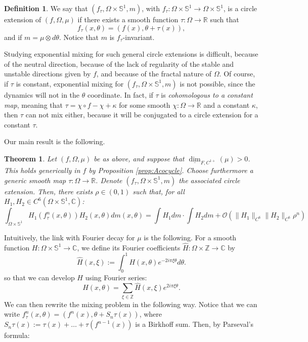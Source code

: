 \documentclass[a4paper]{article}
\newtheorem{theorem}{Theorem}[section]
\theoremstyle{definition}
\newtheorem{definition}{Definition}[section]
\begin{document}
\begin{definition}
We say that $(f_\tau,\Omega \times \mathbb{S}^1,m)$, with $f_\tau:\Omega \times \mathbb{S}^1 \rightarrow \Omega \times \mathbb{S}^1$, is a circle extension of $(f,\Omega,\mu)$ if there exists a smooth function $\tau:\Omega \rightarrow \mathbb{R}$ such that $$ f_\tau(x,\theta) = (f(x),\theta+\tau(x)) ,$$
and if $m = \mu \otimes d\theta$.  Notice that $m$ is $f_\tau$-invariant.
\end{definition}

Studying exponential mixing for such general circle extensions is difficult, because of the neutral direction, because of the lack of regularity of the stable and unstable directions given by $f$, and because of the fractal nature of $\Omega$. Of course, if $\tau$ is constant, exponential mixing for $(f_\tau,\Omega\times \mathbb{S}^1,m)$ is not possible, since the dynamics will not  in the $\theta$ coordinate. In fact, if $\tau$ is \emph{cohomologous to a constant map}, meaning that $\tau= \chi \circ f - \chi + \kappa $ for some smooth $\chi:\Omega\rightarrow \mathbb{R}$ and a constant $\kappa$, then $\tau$ can not mix either, because it will be conjugated to a circle extension for a constant $\tau$.

Our main result is the following.  

\begin{theorem}\label{th:extension}
Let $(f,\Omega,\mu)$ be as above, and suppose that $\underline{\dim}_{F,C^{1+}}(\mu)>0$. This holds generically in $f$ by Proposition \ref{prop:Acocycle}. Choose furthermore a generic smooth map $\tau:\Omega \rightarrow \mathbb{R}$. Denote $(f_\tau,\Omega \times \mathbb{S}^1, m)$ the associated circle extension. Then, there exists $\rho \in (0,1)$ such that, for all $H_1,H_2 \in C^{6}(\Omega \times \mathbb{S}^1,\mathbb{C})$:
$$ \int_{\Omega \times \mathbb{S}^1} H_1(f_\tau^n(x,\theta)) H_2(x,\theta) dm(x,\theta) = \int H_1 dm \cdot \int H_2 dm + \mathcal{O}(\|H_1\|_{C^6}\|H_2\|_{C^6} \rho^n) $$
\end{theorem}

Intuitively, the link with Fourier decay for $\mu$ is the following. For a smooth function $H:\Omega\times \mathbb{S}^1 \rightarrow \mathbb{C}$, we define its Fourier coefficients $\widehat{H}:\Omega \times \mathbb{Z} \rightarrow \mathbb{C}$ by
$$ \widehat{H}(x,\xi) := \int_{0}^1 H(x,\theta) e^{-2 i \pi \xi \theta} d\theta .$$
so that we can develop $H$ using Fourier series: $$H(x,\theta) = \sum_{\xi \in \mathbb{Z}} \widehat{H}(x,\xi) e^{2 i \pi \xi \theta} .$$
We can then rewrite the mixing problem in the following way. Notice that we can write $f_\tau^n(x,\theta) = (f^n(x),\theta+S_n \tau(x))$, where $S_n \tau(x) := \tau(x)+\dots + \tau(f^{n-1}(x))$ is a Birkhoff sum. Then, by Parseval's formula:
\end{document}
